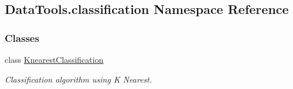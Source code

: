 \hypertarget{namespaceDataTools_1_1classification}{}\subsection{Data\+Tools.\+classification Namespace Reference}
\label{namespaceDataTools_1_1classification}
\subsubsection*{Classes}
\begin{DoxyCompactItemize}
\item 
class \hyperlink{classDataTools_1_1classification_1_1KnearestClassification}{Knearest\+Classification}
\begin{DoxyCompactList}\small\item\em Classification algorithm using K Nearest. \end{DoxyCompactList}\end{DoxyCompactItemize}

